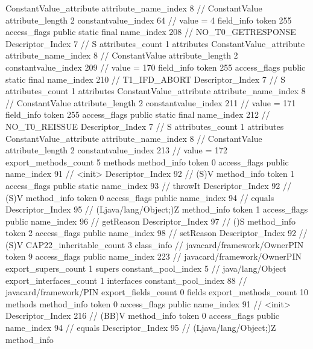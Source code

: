 {{{{{{				ConstantValue_attribute {
					attribute_name_index	8		// ConstantValue
					attribute_length	2
					constantvalue_index	64		// value = 4
				}
				}
			}
			field_info {
				token	255
				access_flags	public static final
				name_index	208		// NO_T0_GETRESPONSE
				Descriptor_Index	7		// S
				attributes_count	1
				attributes {
				ConstantValue_attribute {
					attribute_name_index	8		// ConstantValue
					attribute_length	2
					constantvalue_index	209		// value = 170
				}
				}
			}
			field_info {
				token	255
				access_flags	public static final
				name_index	210		// T1_IFD_ABORT
				Descriptor_Index	7		// S
				attributes_count	1
				attributes {
				ConstantValue_attribute {
					attribute_name_index	8		// ConstantValue
					attribute_length	2
					constantvalue_index	211		// value = 171
				}
				}
			}
			field_info {
				token	255
				access_flags	public static final
				name_index	212		// NO_T0_REISSUE
				Descriptor_Index	7		// S
				attributes_count	1
				attributes {
				ConstantValue_attribute {
					attribute_name_index	8		// ConstantValue
					attribute_length	2
					constantvalue_index	213		// value = 172
				}
				}
			}
			}
			export_methods_count	5
			methods {
				method_info {
					token	0
					access_flags	public
					name_index	91		// <init>
					Descriptor_Index	92		// (S)V
				}
				method_info {
					token	1
					access_flags	public static
					name_index	93		// throwIt
					Descriptor_Index	92		// (S)V
				}
				method_info {
					token	0
					access_flags	public
					name_index	94		// equals
					Descriptor_Index	95		// (Ljava/lang/Object;)Z
				}
				method_info {
					token	1
					access_flags	public
					name_index	96		// getReason
					Descriptor_Index	97		// ()S
				}
				method_info {
					token	2
					access_flags	public
					name_index	98		// setReason
					Descriptor_Index	92		// (S)V
				}
			}
			CAP22_inheritable_count	3
		}
		class_info {		// javacard/framework/OwnerPIN
			token	9
			access_flags	public
			name_index	223		// javacard/framework/OwnerPIN
			export_supers_count	1
			supers {
				constant_pool_index	5		// java/lang/Object
			}
			export_interfaces_count	1
			interfaces {
				constant_pool_index	88		// javacard/framework/PIN
			}
			export_fields_count	0
			fields {
			}
			export_methods_count	10
			methods {
				method_info {
					token	0
					access_flags	public
					name_index	91		// <init>
					Descriptor_Index	216		// (BB)V
				}
				method_info {
					token	0
					access_flags	public
					name_index	94		// equals
					Descriptor_Index	95		// (Ljava/lang/Object;)Z
				}
				method_info {
}}}}}
